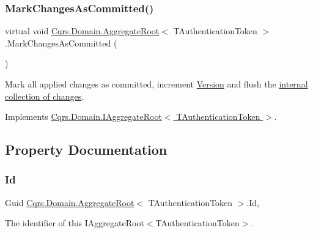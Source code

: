 \subsubsection{\texorpdfstring{Mark\+Changes\+As\+Committed()}{MarkChangesAsCommitted()}}
{\footnotesize\ttfamily virtual void \hyperlink{classCqrs_1_1Domain_1_1AggregateRoot}{Cqrs.\+Domain.\+Aggregate\+Root}$<$ T\+Authentication\+Token $>$.Mark\+Changes\+As\+Committed (\begin{DoxyParamCaption}{ }\end{DoxyParamCaption})\hspace{0.3cm}{\ttfamily [virtual]}}



Mark all applied changes as committed, increment \hyperlink{classCqrs_1_1Domain_1_1AggregateRoot_a15f351663975c1d8e2cdc37b8c4d970f_a15f351663975c1d8e2cdc37b8c4d970f}{Version} and flush the \hyperlink{}{internal collection of changes}. 



Implements \hyperlink{interfaceCqrs_1_1Domain_1_1IAggregateRoot_af31116870bbf6566b3eec0b8bc02c6de_af31116870bbf6566b3eec0b8bc02c6de}{Cqrs.\+Domain.\+I\+Aggregate\+Root$<$ T\+Authentication\+Token $>$}.



\subsection{Property Documentation}
\mbox{\label{classCqrs_1_1Domain_1_1AggregateRoot_ab84d521c8c3bffd3c2e58959984d1e88_ab84d521c8c3bffd3c2e58959984d1e88}} 
\subsubsection{\texorpdfstring{Id}{Id}}
{\footnotesize\ttfamily Guid \hyperlink{classCqrs_1_1Domain_1_1AggregateRoot}{Cqrs.\+Domain.\+Aggregate\+Root}$<$ T\+Authentication\+Token $>$.Id\hspace{0.3cm}{\ttfamily [get]}, {}}



The identifier of this I\+Aggregate\+Root$<$\+T\+Authentication\+Token$>$. 

\mbox{\label{classCqrs_1_1Domain_1_1AggregateRoot_a15f351663975c1d8e2cdc37b8c4d970f_a15f351663975c1d8e2cdc37b8c4d970f}} 
